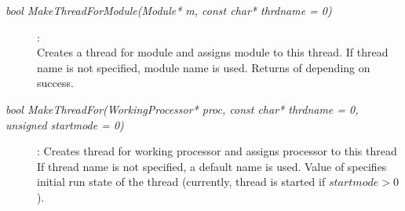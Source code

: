\begin{description}

\item[\em bool MakeThreadForModule\small (Module* m, const char* thrdname = 0) ] :
 \\
Creates a thread for module  and assigns module to this thread.
If thread name  is not specified, module name is used.
Returns  of  
 depending on success.
	   

\item[\em bool MakeThreadFor\small (WorkingProcessor* proc, const char* thrdname = 0, unsigned startmode = 0) ] :
Creates thread for working processor  and assigns processor to this thread
If thread name  is not specified, a default name is used.
Value of  specifies initial run state of the thread
(currently, thread is started if $startmode>0$).


        

	   
\end{description}
	 
